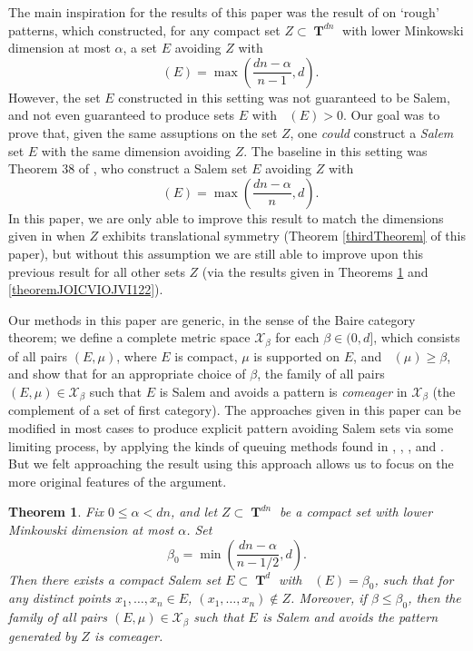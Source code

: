 \documentclass[dvipsnames,letterpaper,12pt]{article}
\numberwithin{equation}{section}
\DeclareMathOperator{\hausdim}{\dim_{\mathbf{H}}}
\DeclareMathOperator{\fordim}{\dim_{\mathbf{F}}}
\DeclareMathOperator{\TT}{\mathbf{T}}
\newtheorem{theorem}{Theorem}
\numberwithin{theorem}{section}
\begin{document}
The main inspiration for the results of this paper was the result of \cite{OurPaper} on `rough' patterns, which constructed, for any compact set $Z \subset \TT^{dn}$ with lower Minkowski dimension at most $\alpha$, a set $E$ avoiding $Z$ with
%
\[ \hausdim(E) = \max\left( \frac{dn - \alpha}{n - 1}, d \right). \]
%
However, the set $E$ constructed in this setting was not guaranteed to be Salem, and not even guaranteed to produce sets $E$ with $\fordim(E) > 0$. Our goal was to prove that, given the same assuptions on the set $Z$, one \emph{could} construct a \emph{Salem} set $E$ with the same dimension avoiding $Z$. The baseline in this setting was Theorem 38 of \cite{MyThesis}, who construct a Salem set $E$ avoiding $Z$ with
%
\[ \fordim(E) = \max \left( \frac{dn - \alpha}{n}, d \right). \]
%
In this paper, we are only able to improve this result to match the dimensions given in \cite{OurPaper} when $Z$ exhibits translational symmetry (Theorem \ref{thirdTheorem} of this paper), but without this assumption we are still able to improve upon this previous result for all other sets $Z$ (via the results given in Theorems \ref{maintheorem} and \ref{theoremJOICVIOJVI122}).

Our methods in this paper are generic, in the sense of the Baire category theorem; we define a complete metric space $\mathcal{X}_\beta$ for each $\beta \in (0,d]$, which consists of all pairs $(E,\mu)$, where $E$ is compact, $\mu$ is supported on $E$, and $\fordim(\mu) \geq \beta$, and show that for an appropriate choice of $\beta$, the family of all pairs $(E,\mu) \in \mathcal{X}_\beta$ such that $E$ is Salem and avoids a pattern is \emph{comeager} in $\mathcal{X}_\beta$ (the complement of a set of first category). The approaches given in this paper can be modified in most cases to produce explicit pattern avoiding Salem sets via some limiting process, by applying the kinds of queuing methods found in \cite{Mythesis}, \cite{OurPaper}, \cite{PramanikFraser}, and \cite{Keleti}. But we felt approaching the result using this approach allows us to focus on the more original features of the argument.


\begin{theorem} \label{maintheorem}
    Fix $0 \leq \alpha < dn$, and let $Z \subset \TT^{dn}$ be a compact set with lower Minkowski dimension at most $\alpha$. Set
    \[ \beta_0 = \min \left( \frac{dn - \alpha}{n-1/2}, d \right). \]
    Then there exists a compact Salem set $E \subset \TT^d$ with $\fordim(E) = \beta_0$, such that for any distinct points $x_1, \dots, x_n \in E$, $(x_1, \dots, x_n) \not \in Z$. Moreover, if $\beta \leq \beta_0$, then the family of all pairs $(E,\mu) \in \mathcal{X}_\beta$ such that $E$ is Salem and avoids the pattern generated by $Z$ is comeager.
\end{theorem}
\end{document}
